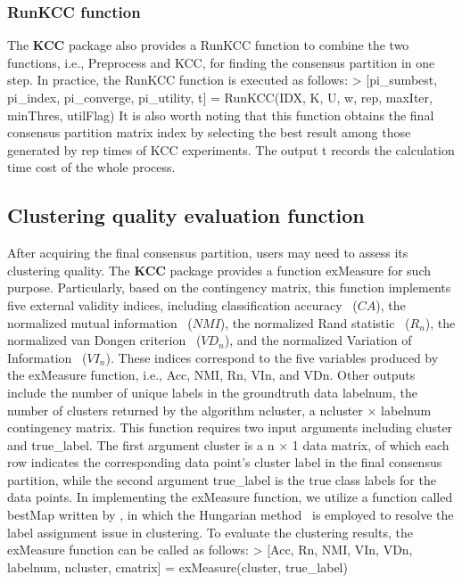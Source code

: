 \documentclass[acmsmall,screen,review]{acmart}
\begin{document}
\subsubsection[RunKCC function]{\textsf{RunKCC} function}
The \textbf{KCC} package also provides a \textsf{RunKCC} function to combine the two functions, i.e., \textsf{Preprocess} and \textsf{KCC}, for finding the consensus partition in one step. In practice, the \textsf{RunKCC} function is executed as follows:
\newline
\newline
\textsf{> [pi\_sumbest, pi\_index, pi\_converge, pi\_utility, t] = RunKCC(IDX, K, U, w, rep, maxIter, minThres, utilFlag)}
\newline
\newline
It is also worth noting that this function obtains the final consensus partition matrix \textsf{index} by selecting the best result among those generated by \textsf{rep} times of \textsf{KCC} experiments. The output \textsf{t} records the calculation time cost of the whole process.

\subsection{Clustering quality evaluation function}
After acquiring the final consensus partition, users may need to assess its clustering quality. The \textbf{KCC} package provides a function \textsf{exMeasure} for such purpose. Particularly, based on the contingency matrix, this function implements five external validity indices, including classification accuracy~\cite{nguyen2007consensus} ($CA$), the normalized mutual information~\cite{cover2012elements} ($NMI$), the normalized Rand statistic~\cite{rand1971objective} ($R_n$), the normalized van Dongen criterion~\cite{dongen2000performance} ($VD_n$), and the normalized Variation of Information~\cite{cover2012elements} ($VI_n$). These indices correspond to the five variables produced by the \textsf{exMeasure} function, i.e., \textsf{Acc}, \textsf{NMI}, \textsf{Rn}, \textsf{VIn}, and \textsf{VDn}. Other outputs include the number of unique labels in the groundtruth data \textsf{labelnum}, the number of clusters returned by the algorithm \textsf{ncluster}, a \textsf{ncluster} $\times$ \textsf{labelnum} contingency matrix. This function requires two input arguments including \textsf{cluster} and \textsf{true\_label}. The first argument \textsf{cluster} is a \textsf{n} $\times$ \textsf{1} data matrix, of which each row indicates the corresponding data point's cluster label in the final consensus partition, while the second argument \textsf{true\_label} is the true class labels for the data points. In implementing the \textsf{exMeasure} function, we utilize a function called \textsf{bestMap} written by \citet{CHH05}, in which the Hungarian method~\cite{carpaneto1980algorithm} is employed to resolve the label assignment issue in clustering. To evaluate the clustering results, the \textsf{exMeasure} function can be called as follows:
\newline
\newline
\textsf{> [Acc, Rn, NMI, VIn, VDn, labelnum, ncluster, cmatrix] = exMeasure(cluster, true\_label)}
\end{document}
